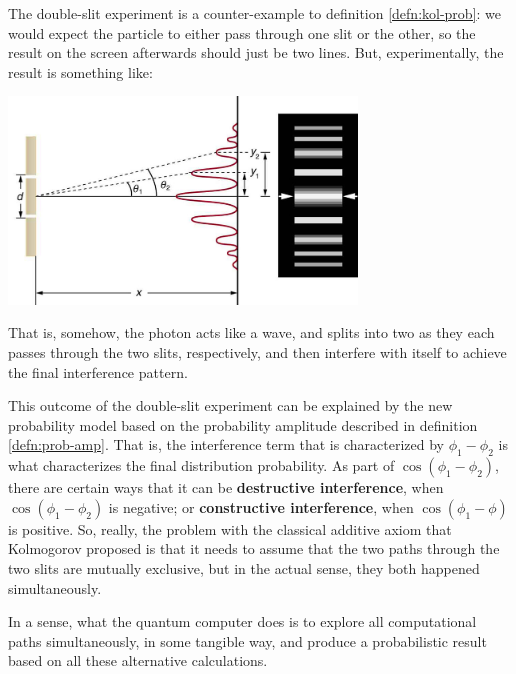 \documentclass[12pt]{article}
\begin{document}
\begin{observation}
The double-slit experiment is a counter-example to definition \ref{defn:kol-prob}: we would expect the particle to either pass through one slit or the other, so the result on the screen afterwards should just be two lines. But, experimentally, the result is something like:
\begin{center}
\includegraphics[width = 25em]{images/1.jpg}
\end{center}
That is, somehow, the photon acts like a wave, and splits into two as they each passes through the two slits, respectively, and then interfere with itself to achieve the final interference pattern.

This outcome of the double-slit experiment can be explained by the new probability model based on the probability amplitude described in definition \ref{defn:prob-amp}. That is, the interference term that is characterized by $\phi_1 - \phi_2$ is what characterizes the final distribution probability. As part of $\cos(\phi_1 - \phi_2)$, there are certain ways that it can be \textbf{destructive interference}, when $\cos(\phi_1 - \phi_2)$ is negative; or \textbf{constructive interference}, when $\cos(\phi_1 - \phi)$ is positive. So, really, the problem with the classical additive axiom that Kolmogorov proposed is that it needs to assume that the two paths through the two slits are mutually exclusive, but in the actual sense, they both happened simultaneously.

In a sense, what the quantum computer does is to explore all computational paths simultaneously, in some tangible way, and produce a probabilistic result based on all these alternative calculations.
\end{observation}
\end{document}
